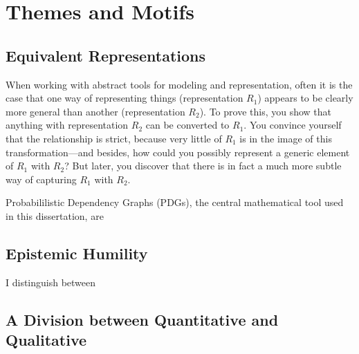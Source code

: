 
\section{}



\section{Themes and Motifs}

\subsection{Equivalent Representations}

When working with abstract tools for modeling and representation, often it is the case that one way of representing things (representation $R_1$) appears to be clearly more general than another (representation $R_2$).
To prove this, you show that anything with representation $R_2$ can be converted to $R_1$.
You convince yourself that the relationship is strict, because very little of $R_1$ is in the image of this transformation---and besides, how could you possibly represent a generic element of $R_1$ with $R_2$? 
But later, you discover that there is in fact a much more subtle way of capturing $R_1$ with $R_2$. 



Probabililistic Dependency Graphs (PDGs), the central mathematical tool used in this dissertation, are 


\subsection{Epistemic Humility}
I distinguish between 

\subsection{A Division between Quantitative and Qualitative}


%


